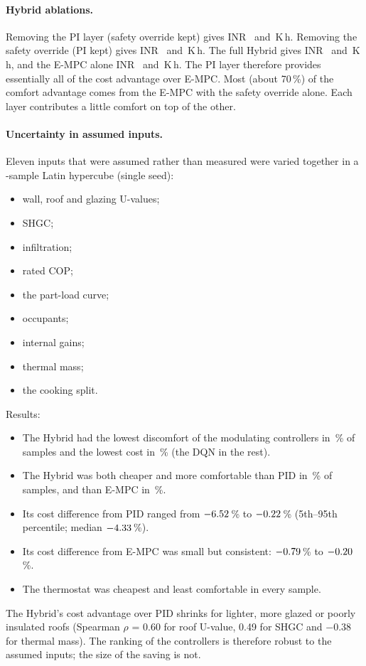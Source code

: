 \paragraph{Hybrid ablations.}
Removing the PI layer (safety override kept) gives INR~\SNoPICostHyb{} and
\SNoPIKhHyb\,K\,h. Removing the safety override (PI kept) gives INR~\SNoSafeCostHyb{}
and \SNoSafeKhHyb\,K\,h. The full Hybrid gives INR~\SBaseCostHyb{} and
\SBaseKhHyb\,K\,h, and the E-MPC alone INR~\SBaseCostMpc{} and \SBaseKhMpc\,K\,h.
The PI layer therefore provides essentially all of the cost advantage over E-MPC.
Most (about 70\,\%) of the comfort advantage comes from the E-MPC with the safety
override alone. Each layer contributes a little comfort on top of the other.

\paragraph{Uncertainty in assumed inputs.}
Eleven inputs that were assumed rather than measured were varied together in a
\UqN-sample Latin hypercube (single seed):
\begin{itemize}
  \item wall, roof and glazing U-values;
  \item SHGC;
  \item infiltration;
  \item rated COP;
  \item the part-load curve;
  \item occupants;
  \item internal gains;
  \item thermal mass;
  \item the cooking split.
\end{itemize}
Results:
\begin{itemize}
  \item The Hybrid had the lowest discomfort of the modulating controllers in
        \UqBestKhHyb\,\% of samples and the lowest cost in \UqBestCostHyb\,\%
        (the DQN in the rest).
  \item The Hybrid was both cheaper and more comfortable than PID in \UqDomHP\,\% of
        samples, and than E-MPC in \UqDomHM\,\%.
  \item Its cost difference from PID ranged from $-6.52$\,\% to
        $-0.22$\,\% (5th--95th percentile; median $-4.33$\,\%).
  \item Its cost difference from E-MPC was small but consistent: $-0.79$\,\% to
        $-0.20$\,\%.
  \item The thermostat was cheapest and least comfortable in every sample.
\end{itemize}
The Hybrid's cost advantage over PID shrinks for lighter, more glazed or poorly
insulated roofs (Spearman $\rho$ = 0.60 for roof U-value, 0.49 for SHGC and $-0.38$
for thermal mass). The ranking of the controllers is therefore robust to the assumed
inputs; the size of the saving is not.

